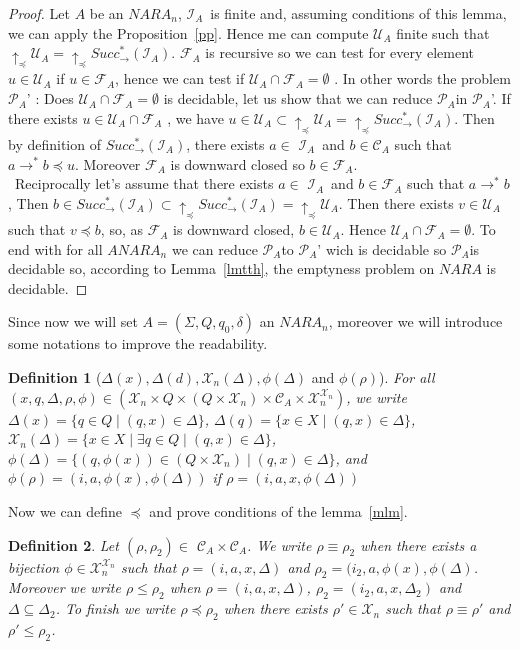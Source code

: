 \documentclass[a4paper,10pt]{report}
\newtheorem{df}{Definition}
\newcommand{\C}{\mathcal{C}_{A}}
\newcommand{\I}{\mathcal{I}_{A}}
\newcommand{\F}{\mathcal{F}_{A}}
\newcommand{\U}{\mathcal{U}_{A}}
\newcommand{\X}{\mathcal{X}_{n}}
\newcommand{\pb}{$\mathcal{P}_{A}$}
\begin{document}
\begin{proof}
  Let $A$ be an $NARA_n$,
  $\I$\ is finite and, assuming conditions of this lemma, we can apply the Proposition~\ref{pp}.
  Hence me can compute $\U$ finite such that $\uparrow_\preceq \U=\uparrow_\preceq Succ^*_\rightarrow (\I)$.
  $\F$ is recursive so we can test for every element $u \in \U$ if $u \in\F$, hence we can test if $\U \cap\F=\emptyset$ . 
  In other words the problem \pb' : Does $\U \cap \F =\emptyset$ is decidable, let us show that we can reduce \pb in \pb'.  
  If there exists $u \in \U \cap \F$ , we have $u\in \U \subset \uparrow_\preceq  \U =\uparrow_\preceq Succ^*_\rightarrow (\I)$. 
  Then by definition of $Succ^*_\rightarrow (\I)$, there exists $a\in$ $\I$\ and $b \in\C$ such that $a \rightarrow^* b \preceq u$.
  Moreover $\F$ is downward closed so $b \in \F$.\\\
  Reciprocally let's assume that there exists $a\in$ $\I$\ and $b \in\F$ such that $a \rightarrow^* b $,
  Then $b \in  Succ^*_\rightarrow (\I) \subset \uparrow_\preceq Succ^*_\rightarrow (\I)=\uparrow_\preceq  \U$. 
  Then there exists $v \in \U$ such that $v \preceq b$, so, as $\F$ is downward closed, $b \in \U$. Hence $\U \cap \F =\emptyset$.
  To end with for all $ANARA_n$ we can reduce \pb to \pb' wich is decidable so \pb is decidable so, according to Lemma~\ref{lmtth},  the emptyness problem on $NARA$ is decidable.
\end{proof}

Since now we will set $A =(\Sigma ,Q ,q_0, \delta )$ an $NARA_n$, moreover we will introduce some notations to improve the readability.

\begin{df}[$\Delta(x), \Delta(d),\X(\Delta), \phi(\Delta)$ and $ \phi(\rho)$]
For all $(x,q,\Delta,\rho,\phi) \in (\X \times Q \times (Q \times \X) \times \C \times \X^{\X})$, we write 
$\Delta(x) = \{ q\in Q \mid (q,x) \in \Delta \}$,
$\Delta(q) = \{ x\in X \mid (q,x) \in \Delta \}$,
$\X(\Delta) = \{ x\in X \mid \exists q\in Q \mid (q,x) \in \Delta \}$,
$\phi(\Delta) = \{ (q,\phi(x)) \in (Q \times \X) \mid (q,x) \in \Delta \}$,
and $\phi(\rho) = (i,a,\phi(x),\phi(\Delta))$ if $\rho = (i,a,x,\phi(\Delta))$
\end{df}

Now we can define $\preceq$ and prove conditions of the lemma~\ref{mlm}.

\begin{df}
  Let $(\rho,\rho_2) \in$  $\C\times\C$.
  We write $\rho \equiv \rho_2$ when there exists a bijection $\phi \in \X^{\X}$ such that  $ \rho=( i,a ,x, \Delta  )$ and $\rho_2=( i_2,a ,\phi(x), \phi(\Delta)$.    
  Moreover we write $\rho \leq \rho_2$ when $ \rho=( i,a ,x, \Delta  )$, $\rho_2=( i_2,a ,x, \Delta_2  )$ and $\Delta \subseteq \Delta_2$.
  To finish we write $\rho \preceq \rho_2$ when there exists $\rho' \in \X$ such that $\rho \equiv \rho'$ and $\rho' \leq \rho_2$.
\end{df}
\end{document}
